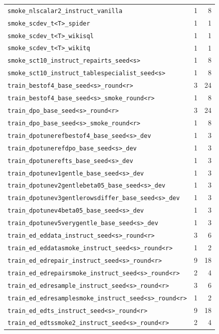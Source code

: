 {\begin{longtable}{@{}p{11.2cm}rr@{}}
\texttt{smoke\_nlscalar2\_instruct\_vanilla} & 1 & 8\\
\texttt{smoke\_scdev\_t<T>\_spider} & 1 & 1\\
\texttt{smoke\_scdev\_t<T>\_wikisql} & 1 & 1\\
\texttt{smoke\_scdev\_t<T>\_wikitq} & 1 & 1\\
\texttt{smoke\_sct10\_instruct\_repairts\_seed<s>} & 1 & 8\\
\texttt{smoke\_sct10\_instruct\_tablespecialist\_seed<s>} & 1 & 8\\
\texttt{train\_bestof4\_base\_seed<s>\_round<r>} & 3 & 24\\
\texttt{train\_bestof4\_base\_seed<s>\_smoke\_round<r>} & 1 & 8\\
\texttt{train\_dpo\_base\_seed<s>\_round<r>} & 3 & 24\\
\texttt{train\_dpo\_base\_seed<s>\_smoke\_round<r>} & 1 & 8\\
\texttt{train\_dpotunerefbestof4\_base\_seed<s>\_dev} & 1 & 3\\
\texttt{train\_dpotunerefdpo\_base\_seed<s>\_dev} & 1 & 3\\
\texttt{train\_dpotunerefts\_base\_seed<s>\_dev} & 1 & 3\\
\texttt{train\_dpotunev1gentle\_base\_seed<s>\_dev} & 1 & 3\\
\texttt{train\_dpotunev2gentlebeta05\_base\_seed<s>\_dev} & 1 & 3\\
\texttt{train\_dpotunev3gentlerowsdiffer\_base\_seed<s>\_dev} & 1 & 3\\
\texttt{train\_dpotunev4beta05\_base\_seed<s>\_dev} & 1 & 3\\
\texttt{train\_dpotunev5verygentle\_base\_seed<s>\_dev} & 1 & 3\\
\texttt{train\_ed\_eddata\_instruct\_seed<s>\_round<r>} & 3 & 6\\
\texttt{train\_ed\_eddatasmoke\_instruct\_seed<s>\_round<r>} & 1 & 2\\
\texttt{train\_ed\_edrepair\_instruct\_seed<s>\_round<r>} & 9 & 18\\
\texttt{train\_ed\_edrepairsmoke\_instruct\_seed<s>\_round<r>} & 2 & 4\\
\texttt{train\_ed\_edresample\_instruct\_seed<s>\_round<r>} & 3 & 6\\
\texttt{train\_ed\_edresamplesmoke\_instruct\_seed<s>\_round<r>} & 1 & 2\\
\texttt{train\_ed\_edts\_instruct\_seed<s>\_round<r>} & 9 & 18\\
\texttt{train\_ed\_edtssmoke2\_instruct\_seed<s>\_round<r>} & 2 & 4\\

\end{longtable}}
